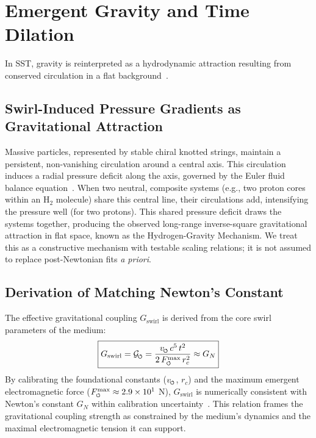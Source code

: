 \documentclass[10pt,reprint,aps,onecolumn,nofootinbib]{revtex4-2}
\newcommand{\bboxeq}[1]{\boxed{\displaystyle #1}}
\newcommand{\Fmaxswirl}{F^{\max}_{\mkern-1mu\scriptscriptstyle\boldsymbol{\circlearrowleft}}}
\begin{document}
\section{Emergent Gravity and Time Dilation}\label{sec:gravity}
In SST, gravity is reinterpreted as a hydrodynamic attraction resulting from conserved circulation in a flat background~\cite{chiralSwirl}.

    \subsection*{Swirl-Induced Pressure Gradients as Gravitational Attraction}
        Massive particles, represented by stable chiral knotted strings, maintain a persistent, non-vanishing circulation around a central axis. This circulation induces a radial pressure deficit along the axis, governed by the Euler fluid balance equation~\cite{sstCanon}. When two neutral, composite systems (e.g., two proton cores within an H$_2$ molecule) share this central line, their circulations add, intensifying the pressure well (for two protons). This shared pressure deficit draws the systems together, producing the observed long-range inverse-square gravitational attraction in flat space, known as the Hydrogen-Gravity Mechanism. We treat this as a constructive mechanism with testable scaling relations; it is not assumed to replace post-Newtonian fits \textit{a priori}.

    \subsection*{Derivation of Matching Newton's Constant}
        The effective gravitational coupling $G_\text{swirl}$ is derived from the core swirl parameters of the medium:
        \begin{equation}
            \bboxeq{
                G_{\text{swirl}}
                = \mathcal{G}_{\mkern-2mu\scriptscriptstyle\boldsymbol{\circlearrowleft}}
                = \frac{v_{\mkern-2mu\scriptscriptstyle\boldsymbol{\circlearrowleft}} \, c^5 \, t^2}{2 \, \Fmaxswirl \, r_c^2}
                \approx G_N
            }
            \label{eq:gswirl}
        \end{equation}
        By calibrating the foundational constants ($v_{\mkern-2mu\scriptscriptstyle\boldsymbol{\circlearrowleft}}$, $r_c$) and the maximum emergent electromagnetic force ($\Fmaxswirl \approx 2.9 \times 10^1$ N), $G_\text{swirl}$ is numerically consistent with Newton's constant $G_N$ within calibration uncertainty~\cite{sstCanon}. This relation frames the gravitational coupling strength as constrained by the medium’s dynamics and the maximal electromagnetic tension it can support.
\end{document}
